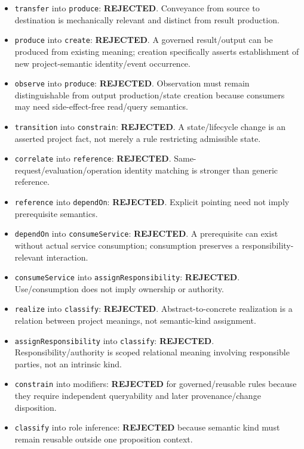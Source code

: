 \documentclass[11pt,a4paper]{article}
\providecommand{\tightlist}{\setlength{\itemsep}{0pt}\setlength{\parskip}{0pt}}
\begin{document}
\begin{itemize}
\tightlist
\item
  \texttt{transfer} into \texttt{produce}: \textbf{REJECTED}. Conveyance from source to destination is mechanically relevant and distinct from result production.
\item
  \texttt{produce} into \texttt{create}: \textbf{REJECTED}. A governed result/output can be produced from existing meaning; creation specifically asserts establishment of new project-semantic identity/event occurrence.
\item
  \texttt{observe} into \texttt{produce}: \textbf{REJECTED}. Observation must remain distinguishable from output production/state creation because consumers may need side-effect-free read/query semantics.
\item
  \texttt{transition} into \texttt{constrain}: \textbf{REJECTED}. A state/lifecycle change is an asserted project fact, not merely a rule restricting admissible state.
\item
  \texttt{correlate} into \texttt{reference}: \textbf{REJECTED}. Same-request/evaluation/operation identity matching is stronger than generic reference.
\item
  \texttt{reference} into \texttt{dependOn}: \textbf{REJECTED}. Explicit pointing need not imply prerequisite semantics.
\item
  \texttt{dependOn} into \texttt{consumeService}: \textbf{REJECTED}. A prerequisite can exist without actual service consumption; consumption preserves a responsibility-relevant interaction.
\item
  \texttt{consumeService} into \texttt{assignResponsibility}: \textbf{REJECTED}. Use/consumption does not imply ownership or authority.
\item
  \texttt{realize} into \texttt{classify}: \textbf{REJECTED}. Abstract-to-concrete realization is a relation between project meanings, not semantic-kind assignment.
\item
  \texttt{assignResponsibility} into \texttt{classify}: \textbf{REJECTED}. Responsibility/authority is scoped relational meaning involving responsible parties, not an intrinsic kind.
\item
  \texttt{constrain} into modifiers: \textbf{REJECTED} for governed/reusable rules because they require independent queryability and later provenance/change disposition.
\item
  \texttt{classify} into role inference: \textbf{REJECTED} because semantic kind must remain reusable outside one proposition context.
\end{itemize}
\end{document}
